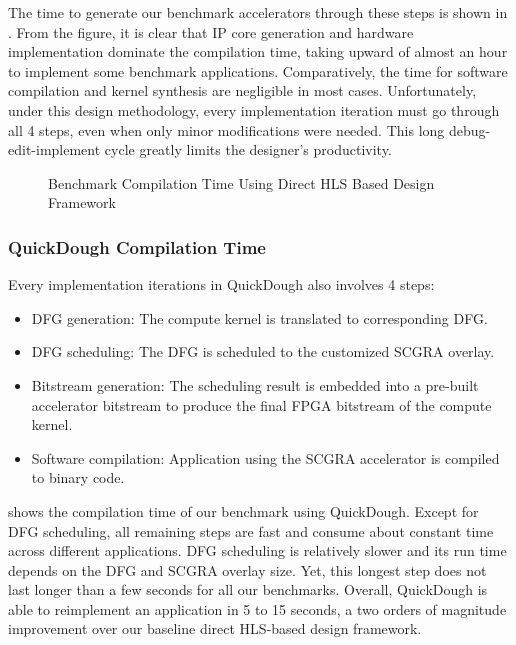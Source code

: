 The time to generate our benchmark accelerators through these steps is shown in .
From the figure, it is clear that IP core generation and hardware implementation dominate the compilation time, taking upward of almost an hour to implement some benchmark applications.
Comparatively, the time for software compilation and kernel synthesis are negligible in most cases.
Unfortunately, under this design methodology, every implementation iteration must go through all 4 steps, even when only minor modifications were needed.
This long debug-edit-implement cycle greatly limits the designer's productivity.

\begin{figure}
\caption{Benchmark Compilation Time Using Direct HLS Based Design Framework}
\label{fig:Vivado-HLS-Compilation-Time}
\end{figure}

\subsubsection{QuickDough Compilation Time}
Every implementation iterations in QuickDough also involves 4 steps:

\begin{itemize}[label=\textbullet,leftmargin=2em,rightmargin=\leftmargin]
\item DFG generation: The compute kernel is translated to corresponding DFG.
\item DFG scheduling: The DFG is scheduled to the customized SCGRA overlay. 
\item Bitstream generation: The scheduling result is embedded into a pre-built accelerator bitstream 
to produce the final FPGA bitstream of the compute kernel.
\item Software compilation: Application using the SCGRA accelerator is compiled to binary code.
\end{itemize}



 shows the compilation time of our benchmark using QuickDough.
Except for DFG scheduling, all remaining steps are fast and consume about constant time across different applications.
DFG scheduling is relatively slower and its run time depends on the DFG and SCGRA overlay size.
Yet, this longest step does not last longer than a few seconds for all our benchmarks.
Overall, QuickDough is able to reimplement an application in 5 to 15 seconds, a two orders of magnitude improvement over our baseline direct HLS-based design framework.

